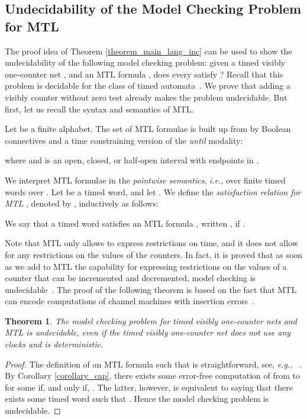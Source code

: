 \documentclass{CSML}
\theoremstyle{plain}\newtheorem{theorem}[thm]{Theorem}
\theoremstyle{plain}\newtheorem{corollary}[thm]{Corollary}
\theoremstyle{plain}\newtheorem{example}[thm]{Example}
\theoremstyle{plain}\newtheorem{lemma}[thm]{Lemma}
\theoremstyle{plain}\newtheorem{remark}[thm]{Remark}
\def\eg{{\em e.g.}}
\newcommand{\mtl}{MTL }
\newcommand*\ie{\textit{i.e.}}
\begin{document}
	\subsection{Undecidability of the Model Checking Problem for \mtl}	
	The proof idea of Theorem \ref{theorem_main_lang_inc} can be used to show the undecidability of the following model checking problem: given a timed visibly one-counter net , and an \mtl formula , does every  satisfy  ?
Recall that this problem is decidable for the class of timed automata~\cite{DBLP:conf/lics/OuaknineW05}.
We prove that adding a visibly counter without zero test already makes the problem undecidable. 
But first, let us recall the syntax and semantics of MTL. 

Let  be a  finite alphabet.
	The set of \mtl formulae is built up from  
        by Boolean connectives and a time constraining version of the {\em until}
modality:

        where  and  is an open, closed, or half-open interval with endpoints in .


We interpret \mtl formulae in the \emph{pointwise semantics}, \ie, over finite timed words over . 
Let  be a timed word, and let  . 
We define the {\em satisfaction relation for \mtl}\hspace{-1.4mm}, denoted by ,
inductively as follows:

We say that a timed word  satisfies an \mtl formula , written , if .



Note that \mtl only allows to express restrictions on time, and it does not allow for any restrictions on the values of the counters. 
In fact, it is proved that as soon as we add to \mtl the capability for expressing restrictions on the values of a counter that can be incremented and decremented, model checking is undecidable~\cite{DBLP:conf/lata/Quaas13}.
The proof of the following theorem is based on the fact that MTL can encode computations of channel machines with insertion errors~\cite{DBLP:conf/lics/OuaknineW05}.
\begin{theorem}
	\label{theorem_model_checking}
	The model checking problem for timed visibly one-counter nets and \mtl is undecidable, even if the timed visibly one-counter net does not use any clocks and is deterministic. 
\end{theorem}
\begin{proof}
	The definition of an \mtl formula  such that  is straightforward, see, \eg, ~\cite{DBLP:conf/lics/OuaknineW05}.
	By Corollary \ref{corollary_cap}, 
	there exists some error-free computation of  from  to  for some  if, and only if, . 
	The latter, however, is equivalent to saying that there exists some timed word  such that . 
	Hence the model checking problem is undecidable. 
\end{proof}
\end{document}
